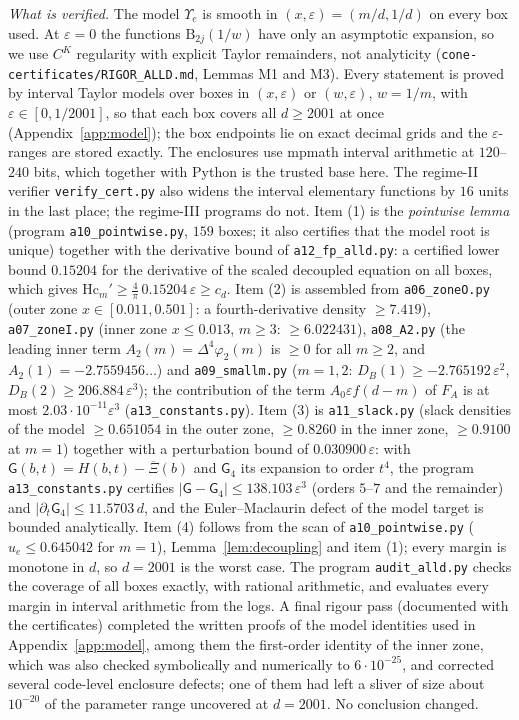 \documentclass[11pt]{amsart}
\theoremstyle{definition}
\theoremstyle{remark}
\numberwithin{equation}{section}
\newcommand{\Xb}{\overline{\Xi}}
\begin{document}
\emph{What is verified.} The model $\Upsilon_e$ is smooth in $(x,\varepsilon)=(m/d,1/d)$ on every box used. At
$\varepsilon=0$ the functions $\mathrm B_{2j}(1/w)$ have only an asymptotic expansion, so we use $C^K$ regularity with explicit
Taylor remainders, not analyticity (\texttt{cone-certificates/RIGOR\_ALLD.md}, Lemmas M1 and M3). Every statement is
proved by interval Taylor models over boxes in $(x,\varepsilon)$ or $(w,\varepsilon)$, $w=1/m$, with
$\varepsilon\in[0,1/2001]$, so that each box covers all $d\ge2001$ at once (Appendix~\ref{app:model}); the box endpoints lie
on exact decimal grids and the $\varepsilon$-ranges are stored exactly. The enclosures use mpmath interval arithmetic at
$120$--$240$ bits, which together with Python is the trusted base here. The regime-II verifier \texttt{verify\_cert.py}
also widens the interval elementary functions by $16$ units in the last place; the regime-III programs do not. Item (1) is the \emph{pointwise lemma} (program
\texttt{a10\_pointwise.py}, $159$ boxes; it also certifies that the model root is unique) together with the derivative
bound of \texttt{a12\_fp\_alld.py}: a certified lower bound $0.15204$ for the derivative of the scaled decoupled equation
on all boxes, which gives $\mathrm{Hc}_m'\ge\frac4\pi\,0.15204\,\varepsilon\ge c_d$. Item (2) is assembled from
\texttt{a06\_zoneO.py} (outer zone $x\in[0.011,0.501]$: a fourth-derivative density $\ge7.419$), \texttt{a07\_zoneI.py}
(inner zone $x\le0.013$, $m\ge3$: $\ge6.022431$), \texttt{a08\_A2.py} (the leading inner term $A_2(m)=\Delta^4\varphi_2(m)$
is $\ge0$ for all $m\ge2$, and $A_2(1)=-2.7559456\ldots$) and \texttt{a09\_smallm.py} ($m=1,2$:
$D_B(1)\ge-2.765192\,\varepsilon^2$, $D_B(2)\ge206.884\,\varepsilon^3$); the contribution of the term $A_0\varepsilon f(d-m)$
of $F_A$ is at most $2.03\cdot10^{-11}\varepsilon^3$ (\texttt{a13\_constants.py}). Item (3) is \texttt{a11\_slack.py}
(slack densities of the model $\ge0.651054$ in the outer zone, $\ge0.8260$ in the inner zone, $\ge0.9100$ at $m=1$)
together with a perturbation bound of $0.030900\,\varepsilon$: with $\mathsf G(b,t)=H(b,t)-\Xb(b)$ and $\mathsf G_4$ its expansion to order
$t^4$, the program \texttt{a13\_constants.py} certifies $|\mathsf G-\mathsf G_4|\le138.103\,\varepsilon^3$ (orders $5$--$7$ and the
remainder) and $|\partial_t\mathsf G_4|\le11.5703\,d$, and the Euler--Maclaurin defect of the model target is bounded
analytically. Item (4) follows from the scan of \texttt{a10\_pointwise.py} ($u_e\le0.645042$ for $m=1$),
Lemma~\ref{lem:decoupling} and item (1); every margin is monotone in $d$, so $d=2001$ is the worst case. The program
\texttt{audit\_alld.py} checks the coverage of all boxes exactly, with rational arithmetic, and evaluates every margin in
interval arithmetic from the logs. A final rigour pass (documented with the certificates) completed the written proofs of
the model identities used in Appendix~\ref{app:model}, among them the first-order identity of the inner zone, which was
also checked symbolically and numerically to $6\cdot10^{-25}$, and corrected several code-level enclosure defects; one
of them had left a sliver of size about $10^{-20}$ of the parameter range uncovered at $d=2001$. No conclusion changed.
\end{document}
